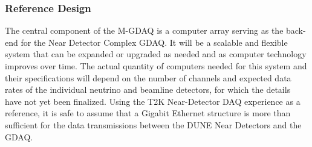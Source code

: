 
\subsubsection{Reference Design}

The central component of the M-GDAQ is a computer array serving as the 
back-end for the Near Detector Complex GDAQ. It will be a scalable and 
flexible system that can be expanded or upgraded as needed and as 
computer technology improves over time. The actual %
quantity of computers needed for this system and their
specifications will depend on the %
number of channels and expected data rates of the individual %
neutrino
and beamline detectors, %
for which the details have not yet been finalized. 
Using the T2K Near-Detector DAQ experience as a reference, 
it is safe to assume that a Gigabit Ethernet structure is more than sufficient for the 
data transmissions between %
the DUNE Near Detectors and the GDAQ.

